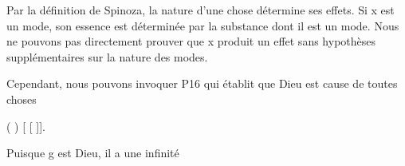 \documentclass[10pt]{report}
\begin{document}
\begin{coqdoccode}
\coqdocemptyline
\coqdocindent{2.00em}
\begin{coqdoccomment}
\coqdocindent{0.50em}
Par\coqdocindent{0.50em}
la\coqdocindent{0.50em}
définition\coqdocindent{0.50em}
de\coqdocindent{0.50em}
Spinoza,\coqdocindent{0.50em}
la\coqdocindent{0.50em}
nature\coqdocindent{0.50em}
d'une\coqdocindent{0.50em}
chose\coqdocindent{0.50em}
détermine\coqdocindent{0.50em}
ses\coqdocindent{0.50em}
effets.\coqdoceol
\coqdocindent{3.50em}
Si\coqdocindent{0.50em}
x\coqdocindent{0.50em}
est\coqdocindent{0.50em}
un\coqdocindent{0.50em}
mode,\coqdocindent{0.50em}
son\coqdocindent{0.50em}
essence\coqdocindent{0.50em}
est\coqdocindent{0.50em}
déterminée\coqdocindent{0.50em}
par\coqdocindent{0.50em}
la\coqdocindent{0.50em}
substance\coqdocindent{0.50em}
dont\coqdocindent{0.50em}
il\coqdocindent{0.50em}
est\coqdocindent{0.50em}
un\coqdocindent{0.50em}
mode.\coqdoceol
\coqdocindent{3.50em}
Nous\coqdocindent{0.50em}
ne\coqdocindent{0.50em}
pouvons\coqdocindent{0.50em}
pas\coqdocindent{0.50em}
directement\coqdocindent{0.50em}
prouver\coqdocindent{0.50em}
que\coqdocindent{0.50em}
x\coqdocindent{0.50em}
produit\coqdocindent{0.50em}
un\coqdocindent{0.50em}
effet\coqdocindent{0.50em}
sans\coqdocindent{0.50em}
hypothèses\coqdocindent{0.50em}
\coqdoceol
\coqdocindent{3.50em}
supplémentaires\coqdocindent{0.50em}
sur\coqdocindent{0.50em}
la\coqdocindent{0.50em}
nature\coqdocindent{0.50em}
des\coqdocindent{0.50em}
modes.\coqdocindent{0.50em}
\end{coqdoccomment}
\coqdoceol
\coqdocemptyline
\coqdocindent{2.00em}
\begin{coqdoccomment}
\coqdocindent{0.50em}
Cependant,\coqdocindent{0.50em}
nous\coqdocindent{0.50em}
pouvons\coqdocindent{0.50em}
invoquer\coqdocindent{0.50em}
P16\coqdocindent{0.50em}
qui\coqdocindent{0.50em}
établit\coqdocindent{0.50em}
que\coqdocindent{0.50em}
Dieu\coqdocindent{0.50em}
est\coqdocindent{0.50em}
cause\coqdocindent{0.50em}
de\coqdocindent{0.50em}
toutes\coqdocindent{0.50em}
choses\coqdocindent{0.50em}
\end{coqdoccomment}
\coqdoceol
\coqdocindent{2.00em}
 ( )  [ [ ]].\coqdoceol
\coqdocemptyline
\coqdocindent{2.00em}
\begin{coqdoccomment}
\coqdocindent{0.50em}
Puisque\coqdocindent{0.50em}
g\coqdocindent{0.50em}
est\coqdocindent{0.50em}
Dieu,\coqdocindent{0.50em}
il\coqdocindent{0.50em}
a\coqdocindent{0.50em}
une\coqdocindent{0.50em}
infinité\coqdocindent{0.50em}

\end{coqdoccomment}
\end{coqdoccode}
\end{document}
